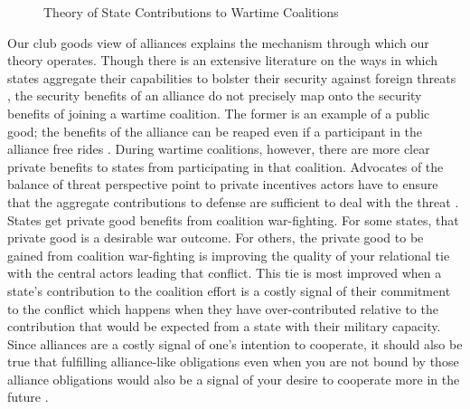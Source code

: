 \documentclass[12pt,letterpaper]{article}
\begin{document}
		\begin{figure}[H]
			\centering
			\caption{Theory of State Contributions to Wartime Coalitions}
			\label{fig:theory}
		\end{figure}

		Our club goods view of alliances explains the mechanism through which our theory operates. Though there is an extensive literature on the ways in which states aggregate their capabilities to bolster their security against foreign threats \citep{waltz_theoryinternationalpolitics_1979}, the security benefits of an alliance do not precisely map onto the security benefits of joining a wartime coalition. The former is an example of a public good; the benefits of the alliance can be reaped even if a participant in the alliance free rides \citep{olson_economictheoryalliances_1966}. During wartime coalitions, however, there are more clear private benefits to states from participating in that coalition. Advocates of the balance of threat perspective point to private incentives actors have to ensure that the aggregate contributions to defense are sufficient to deal with the threat \citep{bennett_friendsneedburden_1997, baltrusaitis_coalitionpoliticsiraq_2010, davidson_neoclassicalrealistexplanation_2011}. States get private good benefits from coalition war-fighting. For some states, that private good is a desirable war outcome.  For others, the private good to be gained from coalition war-fighting is improving the quality of your relational tie with the central actors leading that conflict. This tie is most improved when a state's contribution to the coalition effort is a costly signal of their commitment to the conflict which happens when they have over-contributed relative to the contribution that would be expected from a state with their military capacity. Since alliances are a costly signal of one's intention to cooperate, it should also be true that fulfilling alliance-like obligations even when you are not bound by those alliance obligations would also be a signal of your desire to cooperate more in the future \citep{warren_geometrysecuritymodeling_2010}.
\end{document}
